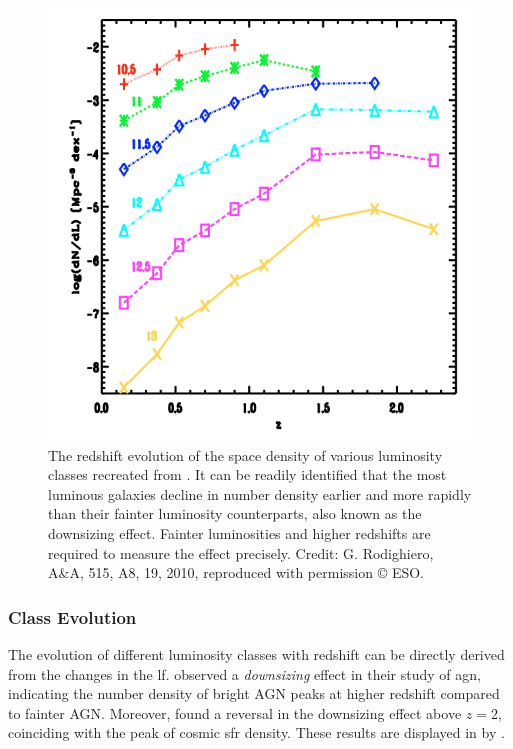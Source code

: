 \begin{figure}[ht!]
    \centering
    \includegraphics[width=\linewidth]{Figures/rodig_CE.png}
    \caption{The redshift evolution of the space density of various luminosity classes recreated from \cite{rodighiero_mid-_2010}. It can be readily identified that the most luminous galaxies decline in number density earlier and more rapidly than their fainter luminosity counterparts, also known as the downsizing effect. Fainter luminosities and higher redshifts are required to measure the effect precisely. Credit: G. Rodighiero, A\&A,  515, A8, 19, 2010, reproduced with permission © ESO.}
    \label{Fig: Example Rodighiero Class Evolution}
\end{figure}

\subsubsection{Class Evolution} \label{Sec: Intro Downsizing}
The evolution of different luminosity classes with redshift can be directly derived from the changes in the \gls{lf}. \cite{han_evolution_2012} observed a \textit{downsizing} effect in their study of \gls{agn}, indicating the number density of bright AGN peaks at higher redshift compared to fainter AGN. Moreover, \cite{merloni_synthesis_2008} found a reversal in the downsizing effect above $z=2$, coinciding with the peak of cosmic \gls{sfr} density. These results are displayed in  by \cite{rodighiero_mid-_2010}. 

